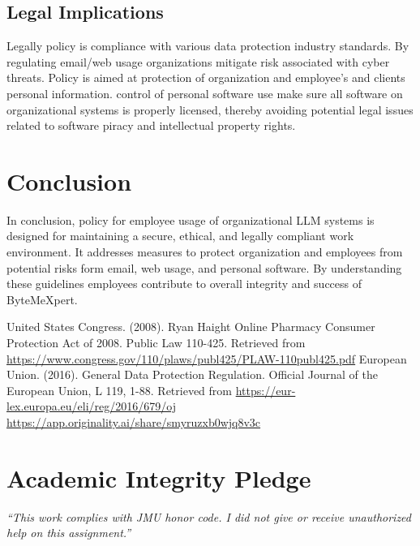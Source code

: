 \documentclass[12pt]{article}
\begin{document}
\subsection{Legal Implications}
\label{subsec:legal-implications}
 
Legally policy is compliance with various data protection industry standards. By regulating email/web usage organizations mitigate risk associated with cyber threats. Policy is aimed at protection of organization and employee’s and clients personal information. control of personal software use make sure all software on organizational systems is properly licensed, thereby avoiding potential legal issues related to software piracy and intellectual property rights.
 
\section{Conclusion}
\label{sec:conclusion}
 
In conclusion, policy for employee usage of organizational LLM systems is designed for maintaining a secure, ethical, and legally compliant work environment. It addresses measures to protect organization and employees from potential risks form email, web usage, and personal software. By understanding these guidelines employees contribute to overall integrity and success of ByteMeXpert.

\newpage
\begin{thebibliography}{9}
United States Congress. (2008). Ryan Haight Online Pharmacy Consumer Protection Act of 2008. \bibitem{}
Public Law 110-425. Retrieved from \url{https://www.congress.gov/110/plaws/publ425/PLAW-110publ425.pdf}
\bibitem{}
European Union. (2016). General Data Protection Regulation. Official Journal of the European Union, L 119, 1-88. Retrieved from \url{https://eur-lex.europa.eu/eli/reg/2016/679/oj}
\bibitem{}
\url{https://app.originality.ai/share/smyruzxb0wjq8v3c}
\end{thebibliography}

\vfill
\section*{Academic Integrity Pledge}
{\color{red}\textit{“This work complies with JMU honor code. I did not give or receive unauthorized help on this assignment.”}}
\end{document}
